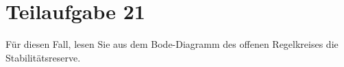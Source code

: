 \section{Teilaufgabe 21}
\begin{aufgabe}
Für diesen Fall, lesen Sie aus dem Bode-Diagramm des offenen Regelkreises die 
Stabilitätsreserve.
\end{aufgabe}
